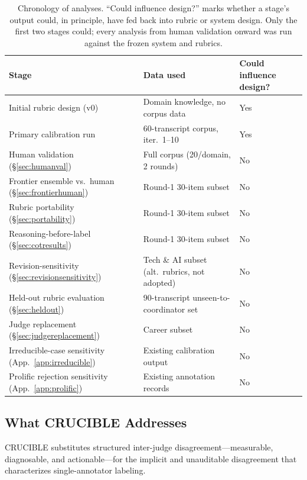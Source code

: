 \documentclass[11pt]{article}
\begin{document}
\begin{table}[ht]
\centering
\caption{Chronology of analyses. ``Could influence design?'' marks whether
a stage's output could, in principle, have fed back into rubric or system
design. Only the first two stages could; every analysis from human
validation onward was run against the frozen system and rubrics.}
\label{tab:chronology}
\footnotesize
\begin{tabular}{lll}
\toprule
\textbf{Stage} & \textbf{Data used} & \textbf{Could influence design?} \\
\midrule
Initial rubric design (v0) & Domain knowledge, no corpus data & Yes \\
Primary calibration run & 60-transcript corpus, iter.\ 1--10 & Yes \\
Human validation (\S\ref{sec:humanval}) & Full corpus (20/domain, 2 rounds) & No \\
Frontier ensemble vs.\ human (\S\ref{sec:frontierhuman}) & Round-1 30-item subset & No \\
Rubric portability (\S\ref{sec:portability}) & Round-1 30-item subset & No \\
Reasoning-before-label (\S\ref{sec:cotresults}) & Round-1 30-item subset & No \\
Revision-sensitivity (\S\ref{sec:revisionsensitivity}) & Tech \& AI subset (alt.\ rubrics, not adopted) & No \\
Held-out rubric evaluation (\S\ref{sec:heldout}) & 90-transcript unseen-to-coordinator set & No \\
Judge replacement (\S\ref{sec:judgereplacement}) & Career subset & No \\
Irreducible-case sensitivity (App.~\ref{app:irreducible}) & Existing calibration output & No \\
Prolific rejection sensitivity (App.~\ref{app:prolific}) & Existing annotation records & No \\
\bottomrule
\end{tabular}
\end{table}

\subsection{What CRUCIBLE Addresses}

CRUCIBLE substitutes
structured inter-judge disagreement---measurable, diagnosable, and
actionable---for the implicit and unauditable disagreement that characterizes
single-annotator labeling.
\end{document}
